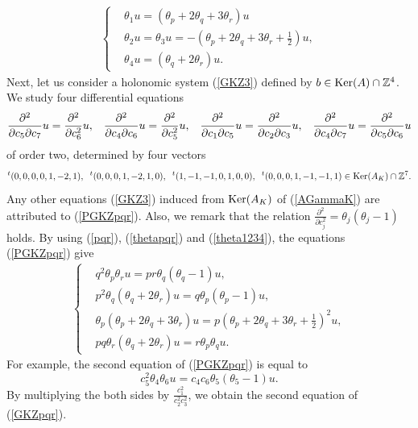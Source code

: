 \documentclass[10pt]{article}
\begin{document}
\begin{align}\label{theta1234}
\begin{cases}
& \theta_1 u =(\theta_p + 2 \theta_q + 3 \theta_r) u \\
& \theta_2 u =\theta_3 u = -(\theta_p + 2 \theta_q + 3 \theta_r+\frac{1}{2} )u,\\
& \theta_4 u =(\theta_q+ 2 \theta_r) u.
\end{cases}
\end{align}
Next,
let us consider a holonomic system (\ref{GKZ3}) defined by $b\in {\rm Ker}(A) \cap \mathbb{Z}^4$. 
We study four differential equations
\begin{align}\label{PGKZpqr}
 \frac{\partial^2}{\partial c_5 \partial c_7} u = \frac{\partial^2}{\partial c_6^2} u , \hspace{3mm}
 \frac{\partial^2}{\partial c_4 \partial c_6} u = \frac{\partial^2}{\partial c_5^2} u , \hspace{3mm}
 \frac{\partial^2}{\partial c_1 \partial c_5} u = \frac{\partial^2}{\partial c_2 \partial c_3} u ,  \hspace{3mm}
 \frac{\partial^2 }{\partial c_4 \partial c_7} u = \frac{\partial^2 }{\partial c_5 \partial c_6} u
\end{align}
of order two,
determined by four vectors
$$
{}^t(0,0,0,0,1,-2,1), \hspace{2mm}  {}^t(0,0,0,1,-2,1,0),  \hspace{2mm}  {}^t(1,-1,-1,0,1,0,0),  \hspace{2mm}  {}^t(0,0,0,1,-1,-1,1) \in {\rm Ker}(A_K)\cap \mathbb{Z}^7. 
$$
Any other equations (\ref{GKZ3}) induced from  ${\rm Ker}(A_K)$  of (\ref{AGammaK})  are attributed to (\ref{PGKZpqr}).
Also, we remark that the relation
$\displaystyle \frac{\partial^2}{\partial c_j^2} =\theta_j (\theta_j -1)$ holds.
By using (\ref{pqr}), (\ref{thetapqr}) and (\ref{theta1234}),
the equations (\ref{PGKZpqr}) give
\begin{align}\label{GKZpqr}
\begin{cases}
&\displaystyle q^2 \theta_p \theta_r u= pr \theta_q (\theta_q -1)u  ,\\
&\displaystyle  p^2 \theta_q(\theta_q + 2 \theta_r) u =  q \theta_p(\theta_p -1) u, \\
&\displaystyle  \theta_p (\theta_p+2\theta_q + 3 \theta_r) u = p \left(\theta_p + 2\theta_q+3\theta_r+\frac{1}{2}\right)^2 u,\\
&\displaystyle  p q \theta_r(\theta_q+2\theta_r)u = r \theta_p \theta_q u.
\end{cases}
\end{align}
For example,
the second equation of (\ref{PGKZpqr}) is equal to 
$$
c_5^2 \theta_4 \theta_6 u = c_4 c_6 \theta_5(\theta_5 -1) u.
$$
By multiplying the both sides by $\displaystyle \frac{c_1^2}{c_2^2 c_3^2}$, 
we obtain the second equation of (\ref{GKZpqr}).
\end{document}
